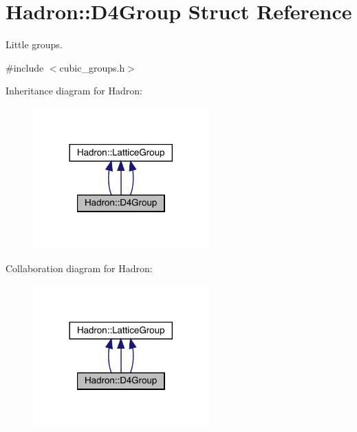 \hypertarget{structHadron_1_1D4Group}{}\section{Hadron\+:\+:D4\+Group Struct Reference}
\label{structHadron_1_1D4Group}


Little groups.  




{\ttfamily \#include $<$cubic\+\_\+groups.\+h$>$}



Inheritance diagram for Hadron\+:
\nopagebreak
\begin{figure}[H]
\begin{center}
\leavevmode
\includegraphics[width=192pt]{d6/d37/structHadron_1_1D4Group__inherit__graph}
\end{center}
\end{figure}


Collaboration diagram for Hadron\+:
\nopagebreak
\begin{figure}[H]
\begin{center}
\leavevmode
\includegraphics[width=192pt]{dc/d1e/structHadron_1_1D4Group__coll__graph}
\end{center}
\end{figure}
